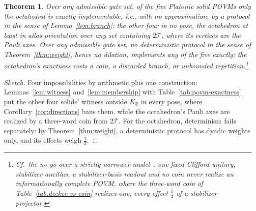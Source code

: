\documentclass[11pt, oneside, openany]{scrbook}
\newcommand{\R}{\mathbb{R}}
\newcommand{\Tgroup}{\mathcal{T}}  %
\newcommand{\TwoT}{2\Tgroup}
\newtheorem{theorem}{Theorem}
\newenvironment{sketch}{\renewcommand{\qedsymbol}{}\begin{proof}[Sketch]}{\end{proof}}
\begin{document}
\begin{theorem} \label{thm:main}
Over any admissible gate set, of the five Platonic solid POVMs only the octahedral is exactly implementable, i.e., with no approximation, by a protocol in the sense of Lemma~\ref{lem:branch}: the other four in no pose, the octahedron at least in atlas orientation over any set containing $\TwoT$, where its vertices are the Pauli axes. Over any admissible gate set, no deterministic protocol in the sense of Theorem~\ref{thm:weight}, hence no dilation, implements any of the five exactly: the octahedron's exactness costs a coin, a discarded branch, or unbounded repetition.\footnote{Cf.\ the no-go over a strictly narrower model~\cite[Thm.~1]{monaco2025nonstabilizernesscostquantum}: one fixed Clifford unitary, stabilizer ancillas, a stabilizer-basis readout and no coin never realize an informationally complete POVM, where the three-word coin of Table~\ref{tab:decker-vs-coin} realizes one, every effect $\tfrac13$ of a stabilizer projector.}
\end{theorem}

\begin{sketch}
Four impossibilities by arithmetic plus one construction: Lemmas~\ref{lem:witness} and~\ref{lem:membership} with Table~\ref{tab:povm-exactness} put the other four solids' witness outside $K_\R$ in every pose, where Corollary~\ref{cor:directions} bans them, while the octahedron's Pauli axes are realized by a three-word coin from $\TwoT$. For the octahedron, determinism fails separately: by Theorem~\ref{thm:weight}, a deterministic protocol has dyadic weights only, and its effects weigh $\tfrac{1}{3}$.
\end{sketch}
\end{document}
